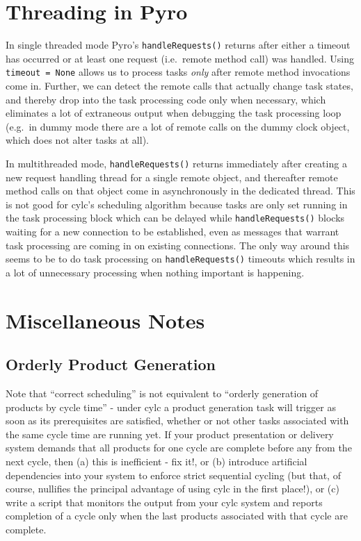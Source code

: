 \documentclass[11pt,a4paper]{article}
\begin{document}
\pagebreak
\section{Threading in Pyro} \label{pyro-appendix}

In single threaded mode Pyro's \lstinline=handleRequests()= returns
after either a timeout has occurred or at least one request
(i.e.\ remote method call) was handled. Using \lstinline|timeout = None| 
allows us to process tasks {\em only} after remote method invocations
come in.  Further, we can detect the remote calls that actually change
task states, and thereby drop into the task processing code only when
necessary, which eliminates a lot of extraneous output when debugging
the task processing loop (e.g.\ in dummy mode there are a lot of remote
calls on the dummy clock object, which does not alter tasks at all). 

In multithreaded mode, \lstinline=handleRequests()= returns immediately
after creating a new request handling thread for a single remote object,
and thereafter remote method calls on that object come in asynchronously
in the dedicated thread. This is not good for cylc's scheduling
algorithm because tasks are only set running in the task processing
block which can be delayed while \lstinline=handleRequests()= blocks waiting
for a new connection to be established, even as messages that warrant
task processing are coming in on existing connections. The only way
around this seems to be to do task processing on \lstinline=handleRequests()=
timeouts which results in a lot of unnecessary processing when nothing
important is happening.


\pagebreak
\section{Miscellaneous Notes}

\subsection{Orderly Product Generation}

Note that ``correct scheduling'' is not equivalent to ``orderly
generation of products by cycle time'' - under cylc a product
generation task will trigger as soon as its prerequisites are satisfied,
whether or not other tasks associated with the same cycle time are
running yet. If your product presentation or delivery system demands
that all products for one cycle are complete before any from the next
cycle, then (a) this is inefficient - fix it!, or (b) introduce artificial
dependencies into your system to enforce strict sequential cycling (but
that, of course, nullifies the principal advantage of using cylc in the
first place!), or (c) write a script that monitors the output from 
your cylc system and reports completion of a cycle only when the last
products associated with that cycle are complete. 
\end{document}
